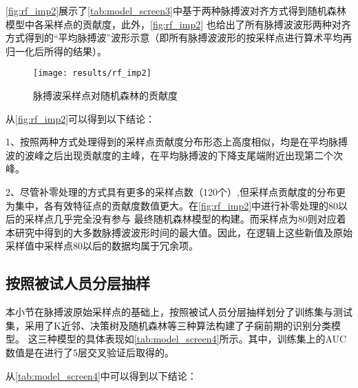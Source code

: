 \autoref{fig:rf_imp2}展示了\autoref{tab:model_screen3}中基于两种脉搏波对齐方式得到随机森林模型中各采样点的贡献度，此外，\autoref{fig:rf_imp2}
也给出了所有脉搏波波形两种对齐方式得到的“平均脉搏波”波形示意（即所有脉搏波波形的按采样点进行算术平均再归一化后所得的结果）。

\begin{figure}[htbp]
      \centering
      \texttt{[image: results/rf\_imp2]}
      \caption{\label{fig:rf_imp2}脉搏波采样点对随机森林的贡献度}
\end{figure}

从\autoref{fig:rf_imp2}可以得到以下结论：

1、按照两种方式处理得到的采样点贡献度分布形态上高度相似，均是在平均脉搏波的波峰之后出现贡献度的主峰，在平均脉搏波的下降支尾端附近出现第二个次峰。

2、尽管补零处理的方式具有更多的采样点数（120个）,但采样点贡献度的分布更为集中，各有效特征点的贡献度数值更大。在\autoref{fig:rf_imp2}中进行补零处理的80以后的采样点几乎完全没有参与
最终随机森林模型的构建。而采样点为80则对应着本研究中得到的大多数脉搏波波形时间的最大值。因此，在逻辑上这些新值及原始采样值中采样点80以后的数据均属于冗余项。

\subsection{按照被试人员分层抽样}

本小节在脉搏波原始采样点的基础上，按照被试人员分层抽样划分了训练集与测试集，采用了K近邻、决策树及随机森林等三种算法构建了子痫前期的识别分类模型。
这三种模型的具体表现如\autoref{tab:model_screen4}所示。其中，训练集上的AUC数值是在进行了5层交叉验证后取得的。

从\autoref{tab:model_screen4}中可以得到以下结论：


